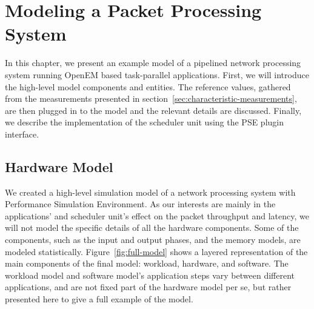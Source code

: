 \chapter{Modeling a Packet Processing System}
\label{chapter:modeling-a-packet-processing-system}

In this chapter, we present an example model of a pipelined network processing system running OpenEM based task-parallel applications. First, we will introduce the high-level model components and entities. The reference values, gathered from the measurements presented in section~\ref{sec:characteristic-measurements}, are then plugged in to the model and the relevant details are discussed. Finally, we describe the implementation of the scheduler unit using the PSE plugin interface.



\section{Hardware Model}
\label{sec:hardware-model}
We created a high-level simulation model of a network processing system with Performance Simulation Environment. As our interests are mainly in the applications' and scheduler unit's effect on the packet throughput and latency, we will not model the specific details of all the hardware components. Some of the components, such as the input and output phases, and the memory models, are modeled statistically. Figure~\ref{fig:full-model} shows a layered representation of the main components of the final model: workload, hardware, and software. The workload model and software model's application steps vary between different applications, and are not fixed part of the hardware model per se, but rather presented here to give a full example of the model.

